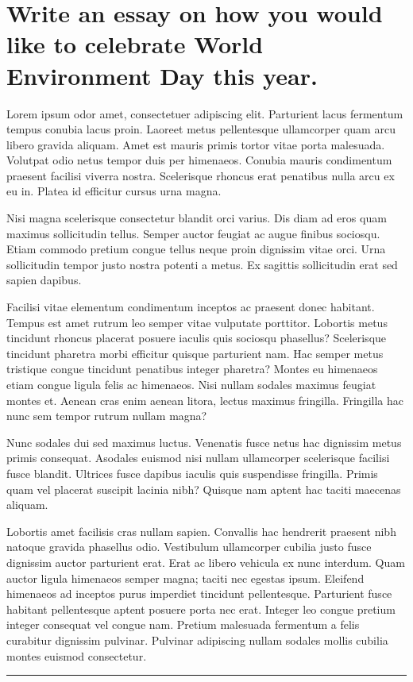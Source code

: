 \documentclass[12pt]{article}
\begin{document}

\lhead{}
\chead{}
\rhead{}

\section{Write an essay on how you would like to celebrate World Environment Day this year.}
Lorem ipsum odor amet, consectetuer adipiscing elit. Parturient lacus fermentum tempus conubia lacus proin. Laoreet metus pellentesque ullamcorper quam arcu libero gravida aliquam. Amet est mauris primis tortor vitae porta malesuada. Volutpat odio netus tempor duis per himenaeos. Conubia mauris condimentum praesent facilisi viverra nostra. Scelerisque rhoncus erat penatibus nulla arcu ex eu in. Platea id efficitur cursus urna magna.

Nisi magna scelerisque consectetur blandit orci varius. Dis diam ad eros quam maximus sollicitudin tellus. Semper auctor feugiat ac augue finibus sociosqu. Etiam commodo pretium congue tellus neque proin dignissim vitae orci. Urna sollicitudin tempor justo nostra potenti a metus. Ex sagittis sollicitudin erat sed sapien dapibus.

Facilisi vitae elementum condimentum inceptos ac praesent donec habitant. Tempus est amet rutrum leo semper vitae vulputate porttitor. Lobortis metus tincidunt rhoncus placerat posuere iaculis quis sociosqu phasellus? Scelerisque tincidunt pharetra morbi efficitur quisque parturient nam. Hac semper metus tristique congue tincidunt penatibus integer pharetra? Montes eu himenaeos etiam congue ligula felis ac himenaeos. Nisi nullam sodales maximus feugiat montes et. Aenean cras enim aenean litora, lectus maximus fringilla. Fringilla hac nunc sem tempor rutrum nullam magna?

Nunc sodales dui sed maximus luctus. Venenatis fusce netus hac dignissim metus primis consequat. Asodales euismod nisi nullam ullamcorper scelerisque facilisi fusce blandit. Ultrices fusce dapibus iaculis quis suspendisse fringilla. Primis quam vel placerat suscipit lacinia nibh? Quisque nam aptent hac taciti maecenas aliquam.

Lobortis amet facilisis cras nullam sapien. Convallis hac hendrerit praesent nibh natoque gravida phasellus odio. Vestibulum ullamcorper cubilia justo fusce dignissim auctor parturient erat. Erat ac libero vehicula ex nunc interdum. Quam auctor ligula himenaeos semper magna; taciti nec egestas ipsum. Eleifend himenaeos ad inceptos purus imperdiet tincidunt pellentesque. Parturient fusce habitant pellentesque aptent posuere porta nec erat. Integer leo congue pretium integer consequat vel congue nam. Pretium malesuada fermentum a felis curabitur dignissim pulvinar. Pulvinar adipiscing nullam sodales mollis cubilia montes euismod consectetur.
\vfill
\rule{\textwidth}{0.4pt}
\newpage
\end{document}

